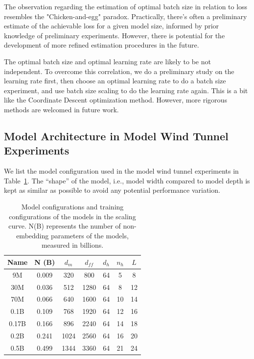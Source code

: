 \documentclass[dvipsnames]{article}
\begin{document}
The observation regarding the estimation of optimal batch size in relation to loss resembles the "Chicken-and-egg" paradox. Practically, there's often a preliminary estimate of the achievable loss for a given model size, informed by prior knowledge of preliminary experiments. However, there is potential for the development of more refined estimation procedures in the future.

The optimal batch size and optimal learning rate are likely to be not independent. To overcome this correlation, we do a preliminary study on the learning rate first, then choose an optimal learning rate to do a batch size experiment, and use batch size scaling to do the learning rate again. This is a bit like the Coordinate Descent optimization method. However, more rigorous methods are welcomed in future work.

\subsection{Model Architecture in Model Wind Tunnel Experiments}
We list the model configuration used in the model wind tunnel experiments in Table~\ref{tab:appmodel_configs}. The ``shape'' of the model, i.e., model width compared to model depth is kept as similar as possible to avoid any potential performance variation.

\begin{table}[htbp]
    \centering
    \begin{tabular}{c|cccccc}
    \toprule
        \textbf{Name} & \textbf{N (B)}& $d_m$ & $d_{ff}$ &$d_h$ & $n_h$ & $L$ \\
    \midrule
          9M    &  0.009 & 320 & 800 & 64 & 5 & 8\\
           30M &   0.036 & 512 & 1280 & 64 & 8 & 12  \\
          70M &  0.066 & 640 & 1600 & 64 & 10 & 14\\
          0.1B &  0.109 & 768 & 1920 & 64 & 12 & 16  \\
         0.17B &  0.166 & 896 & 2240 & 64 & 14 & 18 \\
         0.2B&  0.241 & 1024 & 2560 & 64 & 16 & 20 \\
        0.5B& 0.499 & 1344 & 3360 & 64 & 21 & 24 \\
    \bottomrule
    \end{tabular}
    \caption{Model configurations and training configurations of the models in the scaling curve. N(B) represents the number of non-embedding parameters of the models, measured in billions. 
    }
    \label{tab:appmodel_configs}
\end{table}
\end{document}
